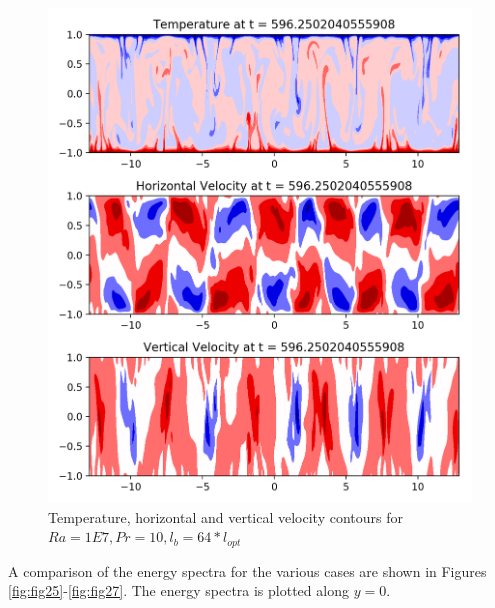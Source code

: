 \documentclass[12pt]{article}
\begin{document}
        \begin{figure}[!htb]
        	\includegraphics[width=\linewidth]{contours_1E7_10_64.png}
        	\caption{Temperature, horizontal and vertical velocity contours for $Ra = 1E7, Pr =10, l_b = 64* l_{opt} $ }
        	\label{fig:fig24}
        \end{figure}
     
     A comparison of the energy spectra for the various cases are shown in Figures \ref{fig:fig25}-\ref{fig:fig27}. The energy spectra is plotted along $y = 0$. 
     
\end{document}
